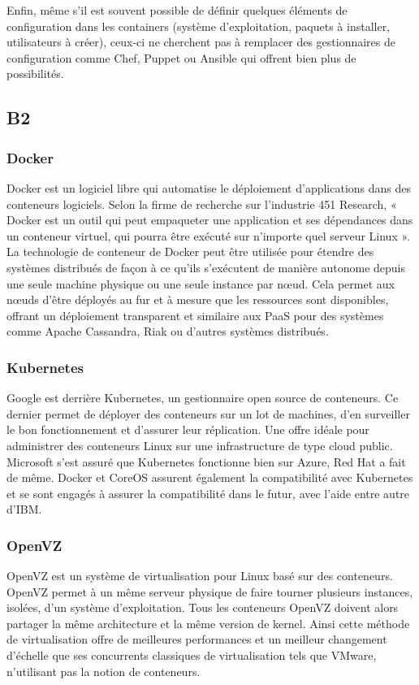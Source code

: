         Enfin, même s'il est souvent possible de définir quelques éléments de configuration dans les containers (système d'exploitation, paquets à installer, utilisateurs à créer), ceux-ci ne cherchent pas à remplacer des gestionnaires de configuration comme Chef, Puppet ou Ansible qui offrent bien plus de possibilités.

\subsection*{B2}

    \subsubsection*{Docker}
    Docker est un logiciel libre qui automatise le déploiement d'applications dans des conteneurs logiciels. Selon la firme de recherche sur l'industrie 451 Research, « Docker est un outil qui peut empaqueter une application et ses dépendances dans un conteneur virtuel, qui pourra être exécuté sur n'importe quel serveur Linux ».\\

    La technologie de conteneur de Docker peut être utilisée pour étendre des systèmes distribués de façon à ce qu'ils s'exécutent de manière autonome depuis une seule machine physique ou une seule instance par nœud. Cela permet aux nœuds d'être déployés au fur et à mesure que les ressources sont disponibles, offrant un déploiement transparent et similaire aux PaaS pour des systèmes comme Apache Cassandra, Riak ou d'autres systèmes distribués.

    \subsubsection*{Kubernetes}
    Google est derrière Kubernetes, un gestionnaire open source de conteneurs. Ce dernier permet de déployer des conteneurs sur un lot de machines, d’en surveiller le bon fonctionnement et d’assurer leur réplication. Une offre idéale pour administrer des conteneurs Linux sur une infrastructure de type cloud public. Microsoft s'est assuré que Kubernetes fonctionne bien sur Azure, Red Hat a fait de même. Docker et CoreOS assurent également la compatibilité avec Kubernetes et se sont engagés à assurer la compatibilité dans le futur, avec l'aide entre autre d'IBM.

    \subsubsection*{OpenVZ}
    OpenVZ est un système de virtualisation pour Linux basé sur des conteneurs. OpenVZ permet à un même serveur physique de faire tourner plusieurs instances, isolées, d'un système d'exploitation. Tous les conteneurs OpenVZ doivent alors partager la même architecture et la même version de kernel. Ainsi cette méthode de virtualisation offre de meilleures performances et un meilleur changement d'échelle que ses concurrents classiques de virtualisation tels que VMware, n'utilisant pas la notion de conteneurs.

